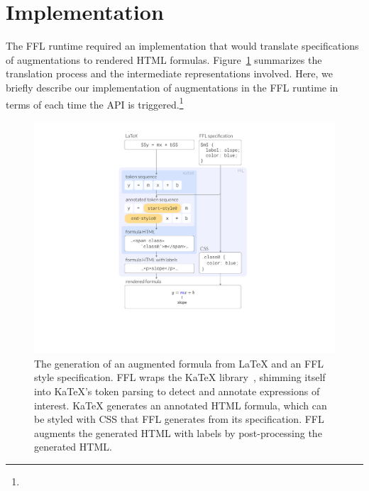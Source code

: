 \section{Implementation}\label{sec:impl}

The FFL runtime required an implementation that would translate specifications of augmentations to rendered HTML formulas. Figure~\ref{fig:dataflow} summarizes the translation process and the intermediate representations involved. Here, we briefly describe our implementation of augmentations in the FFL runtime in terms of each time the API is triggered.\footnote{}

\begin{figure}
    \centering
    \includegraphics[width=.86\columnwidth]{figures/dataflow} 
    \caption{The generation of an augmented formula from LaTeX and an FFL style specification. \normalfont FFL wraps the  KaTeX library~\cite{tool:katex}, shimming itself into KaTeX's token parsing to detect and annotate expressions of interest. KaTeX generates an annotated HTML formula, which can be styled with CSS that FFL generates from its specification. FFL augments the generated HTML with labels by post-processing the generated HTML.}
    \label{fig:dataflow}
\end{figure}

